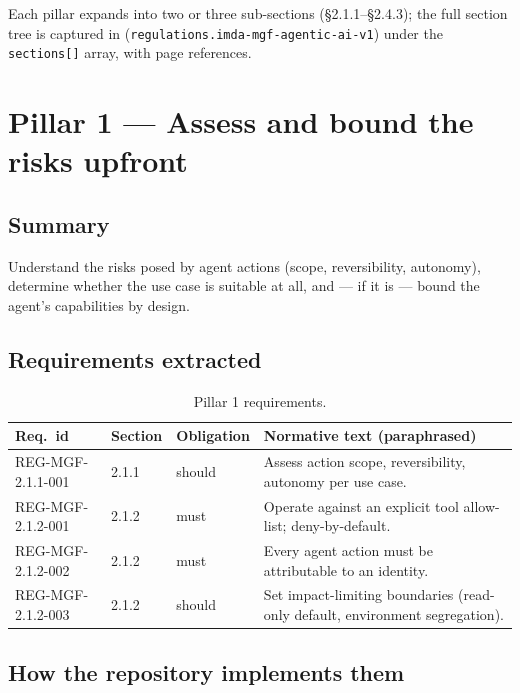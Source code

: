 Each pillar expands into two or three sub-sections (\S2.1.1--\S2.4.3); the
full section tree is captured in
 (\texttt{regulations.imda-mgf-agentic-ai-v1}) under the
\texttt{sections[]} array, with page references.

\section{Pillar 1 --- Assess and bound the risks upfront}
\label{sec:mgf-p1}

\subsection*{Summary}

Understand the risks posed by agent actions (scope, reversibility,
autonomy), determine whether the use case is suitable at all, and --- if
it is --- bound the agent's capabilities by design.

\subsection*{Requirements extracted}

\begin{table}[h]
\centering
\small
\begin{tabularx}{\textwidth}{p{3.2cm}p{1.4cm}p{1.6cm}X}
\toprule
\textbf{Req.\ id} & \textbf{Section} & \textbf{Obligation} & \textbf{Normative text (paraphrased)} \\
\midrule
REG-MGF-2.1.1-001 & 2.1.1 & should & Assess action scope, reversibility, autonomy per use case. \\
REG-MGF-2.1.2-001 & 2.1.2 & must   & Operate against an explicit tool allow-list; deny-by-default. \\
REG-MGF-2.1.2-002 & 2.1.2 & must   & Every agent action must be attributable to an identity. \\
REG-MGF-2.1.2-003 & 2.1.2 & should & Set impact-limiting boundaries (read-only default, environment segregation). \\
\bottomrule
\end{tabularx}
\caption{Pillar 1 requirements.}
\label{tab:p1}
\end{table}

\subsection*{How the repository implements them}

